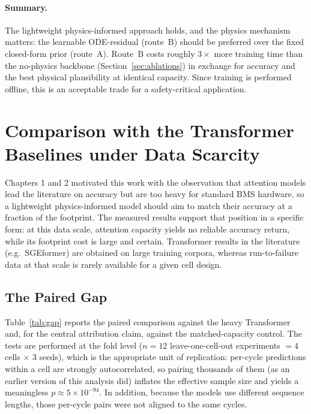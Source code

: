 \paragraph{Summary.} The lightweight physics-informed approach holds, and the
physics mechanism matters: the learnable ODE-residual (route~B) should be
preferred over the fixed closed-form prior (route~A). Route~B costs roughly
$3\times$ more training time than the no-physics backbone
(Section~\ref{sec:ablations}) in exchange for accuracy and the best physical
plausibility at identical capacity. Since training is performed offline, this is
an acceptable trade for a safety-critical application.

\section{Comparison with the Transformer Baselines under Data Scarcity}
\label{sec:transformer_gap}

Chapters 1 and 2 motivated this work with the observation that attention models
lead the literature on accuracy but are too heavy for standard BMS hardware, so a
lightweight physics-informed model should aim to match their accuracy at a
fraction of the footprint. The measured results support that position in a
specific form: at this data scale, attention capacity yields no reliable
accuracy return, while its footprint cost is large and certain. Transformer
results in the literature (e.g.\ SGEformer) are obtained on large training
corpora, whereas run-to-failure data at that scale is rarely available for a
given cell design.

\subsection{The Paired Gap}

Table~\ref{tab:gap} reports the paired comparison against the heavy
Transformer and, for the central attribution claim, against the
matched-capacity control. The tests are performed at the fold level ($n=12$
leave-one-cell-out experiments $=4$ cells $\times$ 3 seeds), which is the
appropriate unit of replication: per-cycle predictions within a cell are strongly autocorrelated, so
pairing thousands of them (as an earlier version of this analysis did) inflates
the effective sample size and yields a meaningless $p\approx5\times10^{-94}$. In
addition, because the models use different sequence lengths, those per-cycle
pairs were not aligned to the same cycles.

